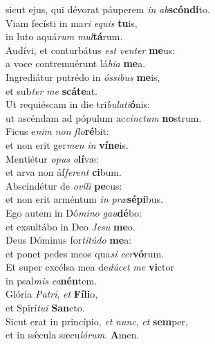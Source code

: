 \evenverse sicut ejus, qui dévorat páuperem \textit{in} \textit{ab}\textbf{scón}\textbf{di}to.\\
\oddverse Viam fecísti in ma\textit{ri} \textit{e}\textit{quis} \textbf{tu}is,~\*\\
\oddverse in luto aquá\textit{rum} \textit{mul}\textbf{tá}rum.\\
\evenverse Audívi, et conturbátus \textit{est} \textit{ven}\textit{ter} \textbf{me}us:~\*\\
\evenverse a voce contremuérunt lá\textit{bi}\textit{a} \textbf{me}a.\\
\oddverse Ingrediátur putrédo in \textit{ós}\textit{si}\textit{bus} \textbf{me}is,~\*\\
\oddverse et sub\textit{ter} \textit{me} \textbf{scá}\textbf{te}at.\\
\evenverse Ut requiéscam in die tri\textit{bu}\textit{la}\textit{ti}\textbf{ó}nis:~\*\\
\evenverse ut ascéndam ad pópulum ac\textit{cín}\textit{ctum} \textbf{no}strum.\\
\oddverse Ficus e\textit{nim} \textit{non} \textit{flo}\textbf{ré}bit:~\*\\
\oddverse et non erit ger\textit{men} \textit{in} \textbf{ví}\textbf{ne}is.\\
\evenverse Mentiétur \textit{o}\textit{pus} \textit{o}\textbf{lí}væ:~\*\\
\evenverse et arva non áf\textit{fe}\textit{rent} \textbf{ci}bum.\\
\oddverse Abscindétur de \textit{o}\textit{ví}\textit{li} \textbf{pe}cus:~\*\\
\oddverse et non erit arméntum \textit{in} \textit{præ}\textbf{sé}\textbf{pi}bus.\\
\evenverse Ego autem in Dó\textit{mi}\textit{no} \textit{gau}\textbf{dé}bo:~\*\\
\evenverse et exsultábo in Deo \textit{Je}\textit{su} \textbf{me}o.\\
\oddverse Deus Dóminus for\textit{ti}\textit{tú}\textit{do} \textbf{me}a:~\*\\
\oddverse et ponet pedes meos qua\textit{si} \textit{cer}\textbf{vó}rum.\\
\evenverse Et super excélsa mea de\textit{dú}\textit{cet} \textit{me} \textbf{vi}ctor~\*\\
\evenverse in psal\textit{mis} \textit{ca}\textbf{nén}tem.\\
\oddverse Glória \textit{Pa}\textit{tri}, \textit{et} \textbf{Fí}\textbf{li}o,~\*\\
\oddverse et Spirí\textit{tu}\textit{i} \textbf{San}cto.\\
\evenverse Sicut erat in princípio, \textit{et} \textit{nunc}, \textit{et} \textbf{sem}per,~\*\\
\evenverse et in sǽcula sæcu\textit{ló}\textit{rum}. \textbf{A}men.\\
